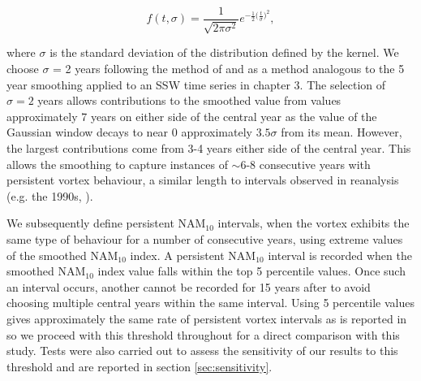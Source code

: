 \begin{equation} \label{Gaussian_filter}
f(t, \sigma) = \frac{1}{\sqrt{2 \pi \sigma^2}} e^{-\frac{1}{2}\big(\frac{t}{\sigma}\big)^2},
\end{equation}

\noindent where $\sigma$ is the standard deviation of the distribution defined by the kernel. We choose $\sigma$ = 2 years following the method of \cite{reichlerStratospheric2012b} and as a method analogous to the 5 year smoothing applied to an SSW time series in chapter 3. The selection of $\sigma = 2$ years allows contributions to the smoothed value from values approximately 7 years on either side of the central year as the value of the Gaussian window decays to near 0 approximately $3.5\sigma$ from its mean. However, the largest contributions come from 3-4 years either side of the central year. This allows the smoothing to capture instances of $\sim$6-8 consecutive years with persistent vortex behaviour, a similar length to intervals observed in reanalysis (e.g. the 1990s, \cite{pawsonCold1999b}). 

We subsequently define persistent NAM$_{10}$ intervals, when the vortex exhibits the same type of behaviour for a number of consecutive years, using extreme values of the smoothed NAM$_{10}$ index. A persistent NAM$_{10}$ interval is recorded when the smoothed NAM$_{10}$ index value falls within the top 5 percentile values. Once such an interval occurs, another cannot be recorded for 15 years after to avoid choosing multiple central years within the same interval. Using 5 percentile values gives approximately the same rate of persistent vortex intervals as is reported in \cite{reichlerStratospheric2012b} so we proceed with this threshold throughout for a direct comparison with this study. Tests were also carried out to assess the sensitivity of our results to this threshold and are reported in section \ref{sec:sensitivity}.

